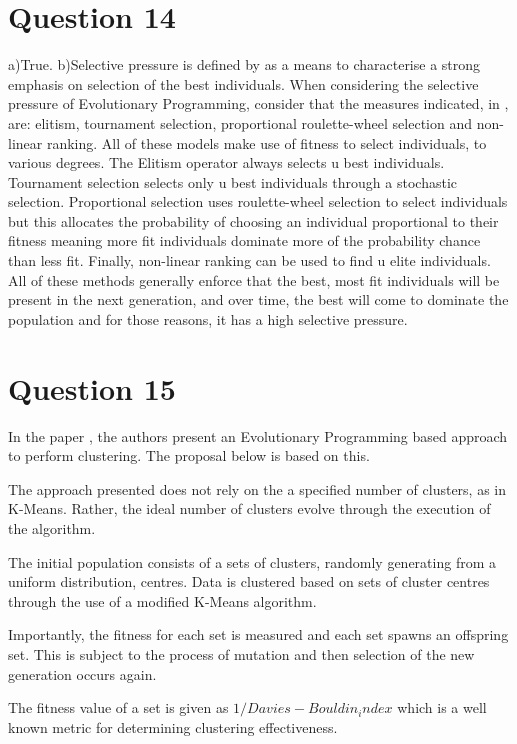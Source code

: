 \documentclass[12pt]{article}
\begin{document}
\section{Question 14}
a)True.
b)Selective pressure is defined by \cite{Back94selectivepressure} as a means to characterise a strong emphasis on selection of the best individuals. When considering the selective pressure of Evolutionary Programming, consider that the measures indicated, in \cite{engelCI02}, are: elitism, tournament selection, proportional roulette-wheel selection and non-linear 
ranking.	All of these models make use of fitness to select individuals, to various degrees.
	The Elitism operator always selects u best individuals. Tournament selection selects only u best individuals through a stochastic selection. Proportional selection uses roulette-wheel selection to select individuals but this allocates the probability of choosing an individual proportional to their fitness meaning more fit individuals dominate more of the probability chance than less fit. Finally, non-linear ranking can be used to find u elite individuals. All of these methods generally enforce that the best, most fit individuals will be present in the next generation, and over time, the best will come to dominate the population and for those reasons, it has a high selective pressure.
\section{Question 15}
In the paper \cite{Sarkar1996}, the authors present an Evolutionary Programming based approach to perform clustering. The proposal below is based on this.

The approach presented does not rely on the a specified number of clusters, as in K-Means. Rather, the ideal number of clusters evolve through the execution of the algorithm.

The initial population consists of a sets of clusters, randomly generating from a uniform distribution, centres. Data is clustered based on sets of cluster centres through the use of a modified K-Means algorithm. 

Importantly, the fitness for each set is measured and each set spawns an offspring set. This is subject to the process of mutation and then selection of the new generation occurs again.

The fitness value of a set is given as $1/Davies-Bouldin_index$ \cite{Jain1988} which is a well known metric for determining clustering effectiveness.
\end{document}
